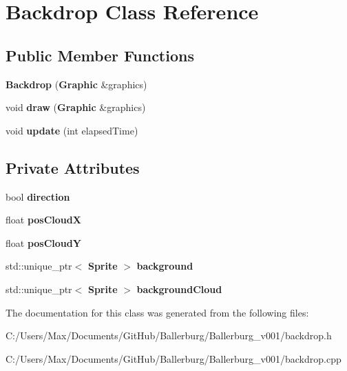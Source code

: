 \section{Backdrop Class Reference}
\label{class_backdrop}
\subsection*{Public Member Functions}
\begin{DoxyCompactItemize}
\item 
{\bfseries Backdrop} ({\bf Graphic} \&graphics)\label{class_backdrop_aff823aed9971b23163805ec4e95fc416}

\item 
void {\bfseries draw} ({\bf Graphic} \&graphics)\label{class_backdrop_a29da942a98d4e2abef1eb319d3e91eb5}

\item 
void {\bfseries update} (int elapsed\+Time)\label{class_backdrop_a884306a0b99b02aedcc8ece6d816c316}

\end{DoxyCompactItemize}
\subsection*{Private Attributes}
\begin{DoxyCompactItemize}
\item 
bool {\bfseries direction}\label{class_backdrop_a5fe4ad01deab5b452b58e012f5fb4cb8}

\item 
float {\bfseries pos\+Cloud\+X}\label{class_backdrop_ad5246c7295feb7eb1b702f68fd61cafc}

\item 
float {\bfseries pos\+Cloud\+Y}\label{class_backdrop_a1f64b463a9aee12954ea71fe5a19d24d}

\item 
std\+::unique\+\_\+ptr$<$ {\bf Sprite} $>$ {\bfseries background}\label{class_backdrop_ac5824d5ad0e1787f278b87439d3af8e8}

\item 
std\+::unique\+\_\+ptr$<$ {\bf Sprite} $>$ {\bfseries background\+Cloud}\label{class_backdrop_a07cfdc5c89945db324bfa91277f913bb}

\end{DoxyCompactItemize}


The documentation for this class was generated from the following files\+:\begin{DoxyCompactItemize}
\item 
C\+:/\+Users/\+Max/\+Documents/\+Git\+Hub/\+Ballerburg/\+Ballerburg\+\_\+v001/backdrop.\+h\item 
C\+:/\+Users/\+Max/\+Documents/\+Git\+Hub/\+Ballerburg/\+Ballerburg\+\_\+v001/backdrop.\+cpp\end{DoxyCompactItemize}
